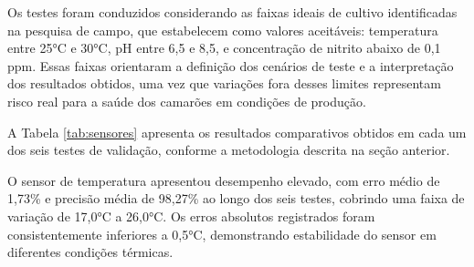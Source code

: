 \documentclass[11pt,a4paper]{article}
\begin{document}
Os testes foram conduzidos considerando as faixas ideais de cultivo identificadas na pesquisa de campo, que estabelecem como valores aceitáveis: temperatura entre 25°C e 30°C, pH entre 6,5 e 8,5, e concentração de nitrito abaixo de 0,1 ppm. Essas faixas orientaram a definição dos cenários de teste e a interpretação dos resultados obtidos, uma vez que variações fora desses limites representam risco real para a saúde dos camarões em condições de produção.

A Tabela \ref{tab:sensores} apresenta os resultados comparativos obtidos em cada um dos seis testes de validação, conforme a metodologia descrita na seção anterior.

\begin{table}[H]
\centering
\caption{Comparação entre valores de referência e leituras do sensor ESP32}
\label{tab:sensores}
\end{table}

O sensor de temperatura apresentou desempenho elevado, com erro médio de 1,73\% e precisão média de 98,27\% ao longo dos seis testes, cobrindo uma faixa de variação de 17,0°C a 26,0°C. Os erros absolutos registrados foram consistentemente inferiores a 0,5°C, demonstrando estabilidade do sensor em diferentes condições térmicas. 
\end{document}
